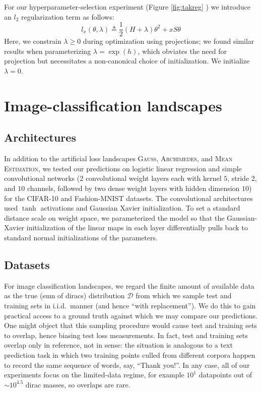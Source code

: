 \documentclass[openany, notitlepage, justified]{tufte-book}
\newcommand{\ofthree}[1]{
    {\tiny \raisebox{0.04cm}{$
        \ifthenelse{\equal{#1}{0}}{{\color{moor}\blacksquare}}{\square}
        \ifthenelse{\equal{#1}{1}}{{\color{moor}\blacksquare}}{\square}    
        \ifthenelse{\equal{#1}{2}}{{\color{moor}\blacksquare}}{\square}
    $}}%
}
\theoremstyle{plain}
\theoremstyle{definition}
\newcommand{\Dd}{\mathcal{D}}
\newcommand{\Gauss}{\textsc{Gauss}}
\newcommand{\Archimedes}{\textsc{Archimedes}}
\newcommand{\MeanEstimation}{\textsc{Mean Estimation}}
\begin{document}
            For our hyperparameter-selection experiment (Figure
            \ref{fig:takreg}\ofthree{2}) we introduce an $l_2$
            regularization term as follows:
            $$
                l_x(\theta, \lambda)
                \triangleq
                \frac{1}{2} (H + \lambda) \theta^2 + x S \theta
            $$
            Here, we constrain $\lambda\geq 0$ during optimization using
            projections; we found similar results when parameterizing $\lambda
            = \exp(h)$, which obviates the need for projection but necessitates
            a non-canonical choice of initialization.  We initialize
            $\lambda=0$.

    \section{Image-classification landscapes}   \label{appendix:natural}

        \subsection{Architectures}
            In addition to the artificial loss landscapes
            \Gauss, \Archimedes, and \MeanEstimation, 
            we tested our predictions on logistic linear regression
            and simple convolutional networks (2 convolutional weight layers
            each with kernel $5$, stride $2$, and $10$ channels, followed by
            two dense weight layers with hidden dimension $10$) for the
            CIFAR-10\cite{kr09} and Fashion-MNIST\cite{xi17} datasets.  The
            convolutional architectures used $\tanh$ activations and Gaussian
            Xavier initialization.  To set a standard distance scale on weight
            space, we parameterized the model so that the
            Gaussian-Xavier initialization of the linear maps in each layer
            differentially pulls back to standard normal initializations of the
            parameters.
            
        \subsection{Datasets}
            For image classification landscapes, we regard the finite amount of
            available data as the true (sum of diracs) distribution $\Dd$ from
            which we sample test and training sets in i.i.d.\ manner (and hence
            ``with replacement'').  We do this to gain practical access to a
            ground truth against which we may compare our predictions.  One
            might object that this sampling procedure would cause test and
            training sets to overlap, hence biasing test loss measurements.  In
            fact, test and training sets overlap only in reference, not in
            sense: the situation is analogous to a text prediction task in
            which two training points culled from different corpora happen to
            record the same sequence of words, say, ``Thank you!''.  In any
            case, all of our experiments focus on the limited-data regime, for
            example
            $10^1$ datapoints out of $\sim 10^{4.5}$ dirac masses, so overlaps
            are rare.
\end{document}

